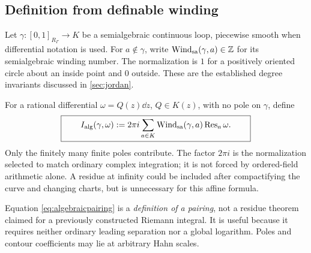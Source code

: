 \documentclass[11pt,letterpaper]{article}
\theoremstyle{definition}
\theoremstyle{remark}
\numberwithin{equation}{section}
\begin{document}
\subsection{Definition from definable winding}
Let $\gamma:[0,1]_{R_\Gamma}\to K$ be a semialgebraic continuous loop, piecewise smooth when differential notation is used. For $a\notin\gamma$, write $\operatorname{Wind}_{\rm sa}(\gamma,a)\in\mathbb Z$ for its semialgebraic winding number. The normalization is $1$ for a positively oriented circle about an inside point and $0$ outside. These are the established degree invariants discussed in \cref{sec:jordan}.

For a rational differential $\omega=Q(z)\dd z$, $Q\in K(z)$, with no pole on $\gamma$, define
\begin{equation}\label{eq:algebraicpairing}
 \boxed{\qquad
 I_{\rm alg}(\gamma,\omega)
 :=2\pi i\sum_{a\in K}\operatorname{Wind}_{\rm sa}(\gamma,a)\operatorname{Res}_a\omega.
 \qquad}
\end{equation}
Only the finitely many finite poles contribute. The factor $2\pi i$ is the normalization selected to match ordinary complex integration; it is not forced by ordered-field arithmetic alone. A residue at infinity could be included after compactifying the curve and changing charts, but is unnecessary for this affine formula.

Equation \eqref{eq:algebraicpairing} is a \emph{definition of a pairing}, not a residue theorem claimed for a previously constructed Riemann integral. It is useful because it requires neither ordinary leading separation nor a global logarithm. Poles and contour coefficients may lie at arbitrary Hahn scales.
\end{document}
